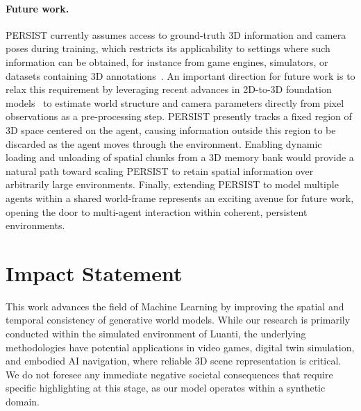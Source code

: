 \documentclass{article}
\theoremstyle{plain}
\theoremstyle{definition}
\theoremstyle{remark}
\begin{document}
\paragraph{Future work.} PERSIST currently assumes access to ground-truth 3D information and camera poses during training, which restricts its applicability to settings where such information can be obtained, for instance from game engines, simulators, or datasets containing 3D annotations~\citep{zhou2018stereo,Matterport3D,yeshwanth2023scannet++}.
An important direction for future work is to relax this requirement by leveraging recent advances in 2D-to-3D foundation models~\citep{wang2025vggt,sam3dteam2025sam3d3dfyimages} to estimate world structure and camera parameters directly from pixel observations as a pre-processing step.
PERSIST presently tracks a fixed region of 3D space centered on the agent, causing information outside this region to be discarded as the agent moves through the environment.
Enabling dynamic loading and unloading of spatial chunks from a 3D memory bank would provide a natural path toward scaling PERSIST to retain spatial information over arbitrarily large environments.
Finally, extending PERSIST to model multiple agents within a shared world-frame represents an exciting avenue for future work, opening the door to multi-agent interaction within coherent, persistent environments.

\section*{Impact Statement}

This work advances the field of Machine Learning by improving the spatial and temporal consistency of generative world models.
While our research is primarily conducted within the simulated environment of Luanti, the underlying methodologies have potential applications in video games, digital twin simulation, and embodied AI navigation, where reliable 3D scene representation is critical.
We do not foresee any immediate negative societal consequences that require specific highlighting at this stage, as our model operates within a synthetic domain.


  


\newpage
\appendix
\onecolumn
\end{document}

